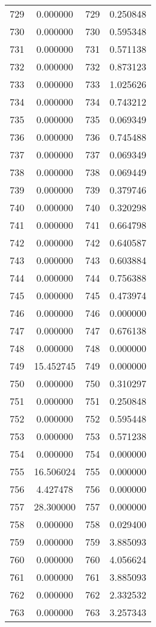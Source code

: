 \documentclass[12pt]{article}
\begin{document}
\begin{longtable}{@{}cccc@{}}
729 & 0.000000 & 729 & 0.250848 \\
730 & 0.000000 & 730 & 0.595348 \\
731 & 0.000000 & 731 & 0.571138 \\
732 & 0.000000 & 732 & 0.873123 \\
733 & 0.000000 & 733 & 1.025626 \\
734 & 0.000000 & 734 & 0.743212 \\
735 & 0.000000 & 735 & 0.069349 \\
736 & 0.000000 & 736 & 0.745488 \\
737 & 0.000000 & 737 & 0.069349 \\
738 & 0.000000 & 738 & 0.069449 \\
739 & 0.000000 & 739 & 0.379746 \\
740 & 0.000000 & 740 & 0.320298 \\
741 & 0.000000 & 741 & 0.664798 \\
742 & 0.000000 & 742 & 0.640587 \\
743 & 0.000000 & 743 & 0.603884 \\
744 & 0.000000 & 744 & 0.756388 \\
745 & 0.000000 & 745 & 0.473974 \\
746 & 0.000000 & 746 & 0.000000 \\
747 & 0.000000 & 747 & 0.676138 \\
748 & 0.000000 & 748 & 0.000000 \\
749 & 15.452745 & 749 & 0.000000 \\
750 & 0.000000 & 750 & 0.310297 \\
751 & 0.000000 & 751 & 0.250848 \\
752 & 0.000000 & 752 & 0.595448 \\
753 & 0.000000 & 753 & 0.571238 \\
754 & 0.000000 & 754 & 0.000000 \\
755 & 16.506024 & 755 & 0.000000 \\
756 & 4.427478 & 756 & 0.000000 \\
757 & 28.300000 & 757 & 0.000000 \\
758 & 0.000000 & 758 & 0.029400 \\
759 & 0.000000 & 759 & 3.885093 \\
760 & 0.000000 & 760 & 4.056624 \\
761 & 0.000000 & 761 & 3.885093 \\
762 & 0.000000 & 762 & 2.332532 \\
763 & 0.000000 & 763 & 3.257343 \\

\end{longtable}
\end{document}
